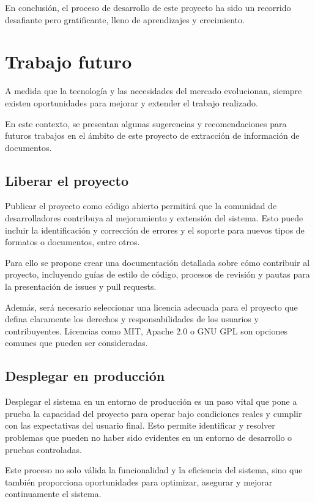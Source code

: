 En conclusión, el proceso de desarrollo de este proyecto ha sido un recorrido desafiante pero gratificante, lleno de
aprendizajes y crecimiento.


\section{Trabajo futuro}

A medida que la tecnología y las necesidades del mercado evolucionan, siempre existen oportunidades para mejorar y
extender el trabajo realizado.

En este contexto, se presentan algunas sugerencias y recomendaciones para futuros trabajos en el ámbito de este proyecto
de extracción de información de documentos.

\subsection*{Liberar el proyecto}

Publicar el proyecto como código abierto permitirá que la comunidad de desarrolladores contribuya al mejoramiento y
extensión del sistema.
Esto puede incluir la identificación y corrección de errores y el soporte para nuevos tipos de formatos o documentos,
entre otros.

Para ello se propone crear una documentación detallada sobre cómo contribuir al proyecto, incluyendo guías de estilo
de código, procesos de revisión y pautas para la presentación de issues y pull requests.

Además, será necesario seleccionar una licencia adecuada para el proyecto que defina claramente los derechos y
responsabilidades de los usuarios y contribuyentes.
Licencias como MIT, Apache 2.0 o GNU GPL son opciones comunes que pueden ser consideradas.

\subsection*{Desplegar en producción}

Desplegar el sistema en un entorno de producción es un paso vital que pone a prueba la capacidad del proyecto para
operar bajo condiciones reales y cumplir con las expectativas del usuario final.
Esto permite identificar y resolver problemas que pueden no haber sido evidentes en un entorno de desarrollo o
pruebas controladas.

Este proceso no solo válida la funcionalidad y la eficiencia del sistema, sino que también proporciona oportunidades
para optimizar, asegurar y mejorar continuamente el sistema.















